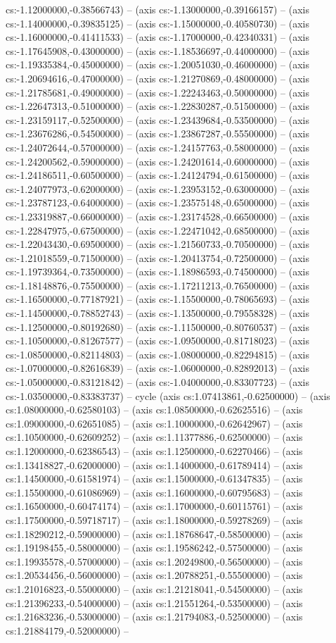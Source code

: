 cs:-1.12000000,-0.38566743) -- (axis cs:-1.13000000,-0.39166157) -- (axis cs:-1.14000000,-0.39835125) -- (axis cs:-1.15000000,-0.40580730) -- (axis cs:-1.16000000,-0.41411533) -- (axis cs:-1.17000000,-0.42340331) -- (axis cs:-1.17645908,-0.43000000) -- (axis cs:-1.18536697,-0.44000000) -- (axis cs:-1.19335384,-0.45000000) -- (axis cs:-1.20051030,-0.46000000) -- (axis cs:-1.20694616,-0.47000000) -- (axis cs:-1.21270869,-0.48000000) -- (axis cs:-1.21785681,-0.49000000) -- (axis cs:-1.22243463,-0.50000000) -- (axis cs:-1.22647313,-0.51000000) -- (axis cs:-1.22830287,-0.51500000) -- (axis cs:-1.23159117,-0.52500000) -- (axis cs:-1.23439684,-0.53500000) -- (axis cs:-1.23676286,-0.54500000) -- (axis cs:-1.23867287,-0.55500000) -- (axis cs:-1.24072644,-0.57000000) -- (axis cs:-1.24157763,-0.58000000) -- (axis cs:-1.24200562,-0.59000000) -- (axis cs:-1.24201614,-0.60000000) -- (axis cs:-1.24186511,-0.60500000) -- (axis cs:-1.24124794,-0.61500000) -- (axis cs:-1.24077973,-0.62000000) -- (axis cs:-1.23953152,-0.63000000) -- (axis cs:-1.23787123,-0.64000000) -- (axis cs:-1.23575148,-0.65000000) -- (axis cs:-1.23319887,-0.66000000) -- (axis cs:-1.23174528,-0.66500000) -- (axis cs:-1.22847975,-0.67500000) -- (axis cs:-1.22471042,-0.68500000) -- (axis cs:-1.22043430,-0.69500000) -- (axis cs:-1.21560733,-0.70500000) -- (axis cs:-1.21018559,-0.71500000) -- (axis cs:-1.20413754,-0.72500000) -- (axis cs:-1.19739364,-0.73500000) -- (axis cs:-1.18986593,-0.74500000) -- (axis cs:-1.18148876,-0.75500000) -- (axis cs:-1.17211213,-0.76500000) -- (axis cs:-1.16500000,-0.77187921) -- (axis cs:-1.15500000,-0.78065693) -- (axis cs:-1.14500000,-0.78852743) -- (axis cs:-1.13500000,-0.79558328) -- (axis cs:-1.12500000,-0.80192680) -- (axis cs:-1.11500000,-0.80760537) -- (axis cs:-1.10500000,-0.81267577) -- (axis cs:-1.09500000,-0.81718023) -- (axis cs:-1.08500000,-0.82114803) -- (axis cs:-1.08000000,-0.82294815) -- (axis cs:-1.07000000,-0.82616839) -- (axis cs:-1.06000000,-0.82892013) -- (axis cs:-1.05000000,-0.83121842) -- (axis cs:-1.04000000,-0.83307723) -- (axis cs:-1.03500000,-0.83383737) -- cycle (axis cs:1.07413861,-0.62500000) -- (axis cs:1.08000000,-0.62580103) -- (axis cs:1.08500000,-0.62625516) -- (axis cs:1.09000000,-0.62651085) -- (axis cs:1.10000000,-0.62642967) -- (axis cs:1.10500000,-0.62609252) -- (axis cs:1.11377886,-0.62500000) -- (axis cs:1.12000000,-0.62386543) -- (axis cs:1.12500000,-0.62270466) -- (axis cs:1.13418827,-0.62000000) -- (axis cs:1.14000000,-0.61789414) -- (axis cs:1.14500000,-0.61581974) -- (axis cs:1.15000000,-0.61347835) -- (axis cs:1.15500000,-0.61086969) -- (axis cs:1.16000000,-0.60795683) -- (axis cs:1.16500000,-0.60474174) -- (axis cs:1.17000000,-0.60115761) -- (axis cs:1.17500000,-0.59718717) -- (axis cs:1.18000000,-0.59278269) -- (axis cs:1.18290212,-0.59000000) -- (axis cs:1.18768647,-0.58500000) -- (axis cs:1.19198455,-0.58000000) -- (axis cs:1.19586242,-0.57500000) -- (axis cs:1.19935578,-0.57000000) -- (axis cs:1.20249800,-0.56500000) -- (axis cs:1.20534456,-0.56000000) -- (axis cs:1.20788251,-0.55500000) -- (axis cs:1.21016823,-0.55000000) -- (axis cs:1.21218041,-0.54500000) -- (axis cs:1.21396233,-0.54000000) -- (axis cs:1.21551264,-0.53500000) -- (axis cs:1.21683236,-0.53000000) -- (axis cs:1.21794083,-0.52500000) -- (axis cs:1.21884179,-0.52000000) -- 